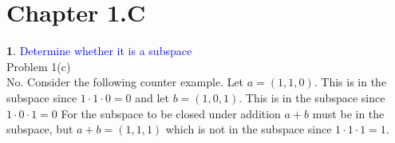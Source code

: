 \documentclass[10pt, twocolumn]{article}
\newcommand{\question}[1]{\textcolor{blue}{#1} \\}
\theoremstyle{definition}
\newtheorem{q}{}
\begin{document}
\section{Chapter 1.C}
\begin{q}
\question{Determine whether it is a subspace}
    Problem 1(c) \\
    No. Consider the following counter example. 
    Let $ a = (1, 1, 0) $. This is in the subspace since $ 1 \cdot 1 \cdot 0 = 0 $ 
    and let  $ b = (1, 0, 1) $. This is in the subspace since $ 1 \cdot 0 \cdot 1 = 0 $ 
    For the subspace to be closed under addition $ a + b $ must be in the subspace, 
    but $ a + b = (1, 1, 1) $ which is not in the subspace since $ 1 \cdot 1 \cdot 1 = 1 $.
\end{q}
\end{document}
